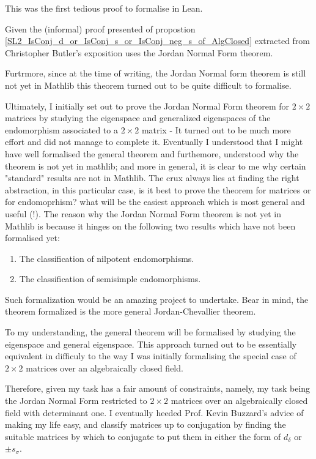 \begin{remark}

This was the first tedious proof to formalise in Lean.

Given the (informal) proof presented of propostion \ref{SL2_IsConj_d_or_IsConj_s_or_IsConj_neg_s_of_AlgClosed} extracted from Christopher Butler's exposition uses the Jordan Normal Form theorem. 

Furtrmore, since at the time of writing, the Jordan Normal form theorem is still not yet in Mathlib this theorem turned out to be quite difficult to formalise.

Ultimately, I initially set out to prove the Jordan Normal Form theorem for $2 \times 2$ matrices by studying the eigenspace and generalized eigenspaces of the endomorphism associated to a $2 \times 2$ matrix - It turned out to be much more effort and did not manage to complete it. 
Eventually I understood that I might have well formalised the general theorem and furthemore, understood why the theorem is not yet in mathlib; and more in general, it is clear to me why certain "standard" results are not in Mathlib. 
The crux always lies at finding the right abstraction, in this particular case, is it best to prove the theorem for matrices or for endomoprhism? what will be the easiest approach which is most general and useful (!).
The reason why the Jordan Normal Form theorem is not yet in Mathlib is because it hinges on the following two results which have not been formalised yet:

\begin{enumerate}
    \item The classification of nilpotent endomorphisms.
    \item The classification of semisimple endomorphisms.
\end{enumerate}

Such formalization would be an amazing project to undertake. Bear in mind, the theorem formalized is the more general Jordan-Chevallier theorem.

To my understanding, the general theorem will be formalised by studying the eigenspace and general eigenspace. This approach turned out to be essentially equivalent in difficuly to the way I was initially formalising the special case of $2 \times 2$ matrices over an algebraically closed field.

Therefore, given my task has a fair amount of constraints, namely, my task being the Jordan Normal Form restricted to $2 \times 2$ matrices over an algebraically closed field with determinant one. I eventually heeded Prof. Kevin Buzzard's advice of making my life easy, and classify matrices up to conjugation 
by finding the suitable matrices by which to conjugate to put them in either the form of $d_\delta$ or $\pm s_\sigma$.
\end{remark}

